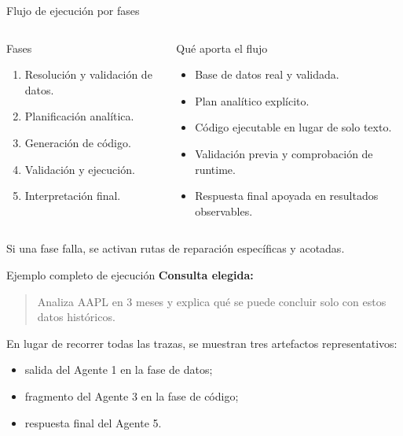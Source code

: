\documentclass[aspectratio=169]{beamer}
\begin{document}
\begin{frame}{Flujo de ejecución por fases}
\begin{columns}[T]
\begin{block}{Fases}
\begin{enumerate}
  \item Resolución y validación de datos.
  \item Planificación analítica.
  \item Generación de código.
  \item Validación y ejecución.
  \item Interpretación final.
\end{enumerate}
\end{block}

\begin{block}{Qué aporta el flujo}
\begin{itemize}
  \item Base de datos real y validada.
  \item Plan analítico explícito.
  \item Código ejecutable en lugar de solo texto.
  \item Validación previa y comprobación de runtime.
  \item Respuesta final apoyada en resultados observables.
\end{itemize}
\end{block}
\end{columns}

\vspace{0.2cm}
Si una fase falla, se activan rutas de reparación específicas y acotadas.
\end{frame}

\begin{frame}{Ejemplo completo de ejecución}
\textbf{Consulta elegida:}

\vspace{0.2cm}

\begin{quote}
Analiza AAPL en 3 meses y explica qué se puede concluir solo con estos datos históricos.
\end{quote}

\vspace{0.3cm}

En lugar de recorrer todas las trazas, se muestran tres artefactos representativos:
\begin{itemize}
  \item salida del Agente 1 en la fase de datos;
  \item fragmento del Agente 3 en la fase de código;
  \item respuesta final del Agente 5.
\end{itemize}
\end{frame}
\end{document}
